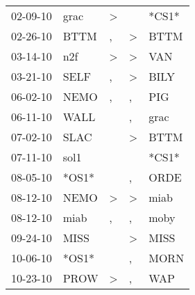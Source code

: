 \begin{supertabular}{p{0.07\textwidth}p{0.06\textwidth}p{0.02\textwidth}p{0.02\textwidth}p{0.06\textwidth}}
          02-09-10\textsuperscript{} &           grac\textsuperscript{} &     \textgreater &                  &                            *CS1* \\
          02-26-10\textsuperscript{} &           BTTM\textsuperscript{} &                , &     \textgreater &           BTTM\textsuperscript{} \\
          03-14-10\textsuperscript{} &            n2f\textsuperscript{} &     \textgreater &     \textgreater &            VAN\textsuperscript{} \\
          03-21-10\textsuperscript{} &           SELF\textsuperscript{} &                , &     \textgreater &           BILY\textsuperscript{} \\
          06-02-10\textsuperscript{} &           NEMO\textsuperscript{} &                , &                , &            PIG\textsuperscript{} \\
          06-11-10\textsuperscript{} &           WALL\textsuperscript{} &                  &                , &           grac\textsuperscript{} \\
          07-02-10\textsuperscript{} &           SLAC\textsuperscript{} &                  &     \textgreater &           BTTM\textsuperscript{} \\
          07-11-10\textsuperscript{} &           sol1\textsuperscript{} &                  &                  &                            *CS1* \\
          08-05-10\textsuperscript{} &                            *OS1* &                  &                , &           ORDE\textsuperscript{} \\
          08-12-10\textsuperscript{} &           NEMO\textsuperscript{} &     \textgreater &     \textgreater &           miab\textsuperscript{} \\
          08-12-10\textsuperscript{} &           miab\textsuperscript{} &                , &                , &           moby\textsuperscript{} \\
          09-24-10\textsuperscript{} &           MISS\textsuperscript{} &                  &     \textgreater &           MISS\textsuperscript{} \\
          10-06-10\textsuperscript{} &                            *OS1* &                  &                , &           MORN\textsuperscript{} \\
          10-23-10\textsuperscript{} &           PROW\textsuperscript{} &     \textgreater &                , &            WAP\textsuperscript{} \\

\end{supertabular}
